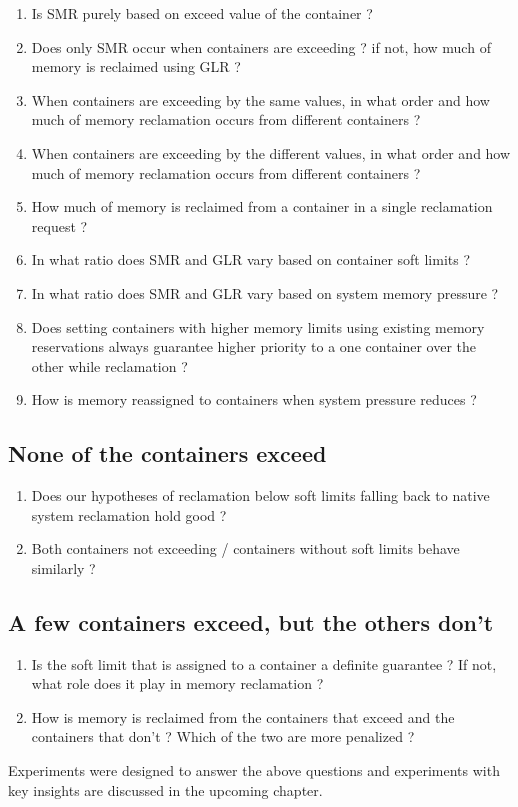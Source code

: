       \begin{enumerate}
	\item Is SMR purely based on exceed value of the container ?
	\item Does only SMR occur when containers are exceeding ? if not, how much of memory is reclaimed using GLR ?
	\item When containers are exceeding by the same values, in what order and how much of memory reclamation occurs from different 
containers ?
	\item When containers are exceeding by the different values, in what order and how much of memory reclamation occurs from different 
containers ?
	\item How much of memory is reclaimed from a container in a single reclamation request ?
	\item In what ratio does SMR and GLR vary based on container soft limits ?
	\item In what ratio does SMR and GLR vary based on system memory pressure ?
	\item Does setting containers with higher memory limits using existing memory reservations always guarantee higher priority to a 
one container over the other while reclamation ?
	\item How is memory reassigned to containers when system pressure reduces ?
      \end{enumerate}
  
  \subsection{None of the containers exceed}
  
    \begin{enumerate}
      \item Does our hypotheses of reclamation below soft limits falling back to native system reclamation hold good ?
      \item Both containers not exceeding / containers without soft limits behave similarly ? 
    \end{enumerate}
  
  \subsection{A few containers exceed, but the others don’t}
  
    \begin{enumerate}
      \item Is the soft limit that is assigned to a container a definite guarantee ? If not, what role does it play in memory reclamation ?
      \item How is memory is reclaimed from the containers that exceed and the containers that don’t ? Which of the two are more penalized ?
    \end{enumerate}
    
  Experiments were designed to answer the above questions and experiments with key insights are discussed in the upcoming chapter.


	